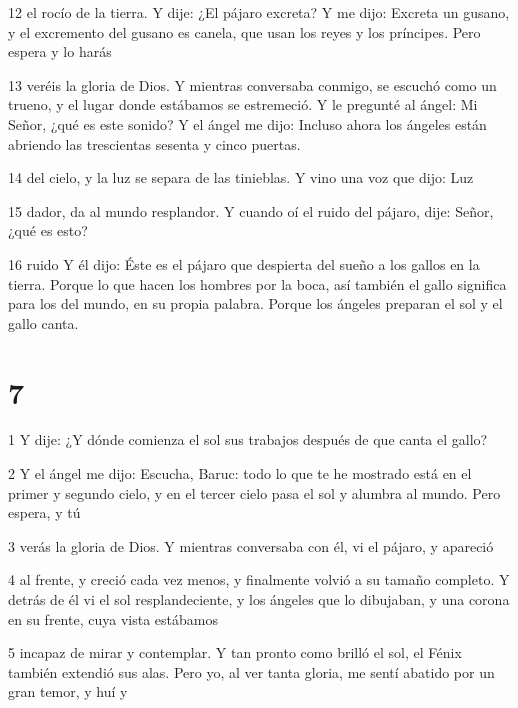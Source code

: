 \par 12 el rocío de la tierra. Y dije: ¿El pájaro excreta? Y me dijo: Excreta un gusano, y el excremento del gusano es canela, que usan los reyes y los príncipes. Pero espera y lo harás

\par 13 veréis la gloria de Dios. Y mientras conversaba conmigo, se escuchó como un trueno, y el lugar donde estábamos se estremeció. Y le pregunté al ángel: Mi Señor, ¿qué es este sonido? Y el ángel me dijo: Incluso ahora los ángeles están abriendo las trescientas sesenta y cinco puertas.

\par 14 del cielo, y la luz se separa de las tinieblas. Y vino una voz que dijo: Luz

\par 15 dador, da al mundo resplandor. Y cuando oí el ruido del pájaro, dije: Señor, ¿qué es esto?

\par 16 ruido Y él dijo: Éste es el pájaro que despierta del sueño a los gallos en la tierra. Porque lo que hacen los hombres por la boca, así también el gallo significa para los del mundo, en su propia palabra. Porque los ángeles preparan el sol y el gallo canta.

\chapter{7}

\par 1 Y dije: ¿Y dónde comienza el sol sus trabajos después de que canta el gallo?

\par 2 Y el ángel me dijo: Escucha, Baruc: todo lo que te he mostrado está en el primer y segundo cielo, y en el tercer cielo pasa el sol y alumbra al mundo. Pero espera, y tú

\par 3 verás la gloria de Dios. Y mientras conversaba con él, vi el pájaro, y apareció

\par 4 al frente, y creció cada vez menos, y finalmente volvió a su tamaño completo. Y detrás de él vi el sol resplandeciente, y los ángeles que lo dibujaban, y una corona en su frente, cuya vista estábamos

\par 5 incapaz de mirar y contemplar. Y tan pronto como brilló el sol, el Fénix también extendió sus alas. Pero yo, al ver tanta gloria, me sentí abatido por un gran temor, y huí y

